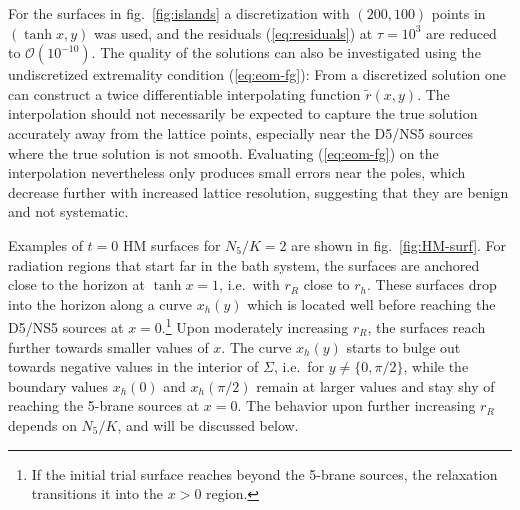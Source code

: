 \documentclass[aps,prd,11pt,notitlepage,longbibliography,nofootinbib,tightenlines,preprintnumbers]{revtex4-1}
\begin{document}
For the surfaces in fig.~\ref{fig:islands} a discretization with $(200,100)$ points in $(\tanh x,y)$ was used, and the residuals (\ref{eq:residuals}) at $\tau=10^3$ are reduced to $\mathcal O(10^{-10})$. 
The quality of the solutions can also be investigated using the undiscretized extremality condition (\ref{eq:eom-fg}):
From a discretized solution one can construct a twice differentiable interpolating function $\tilde r(x,y)$. The interpolation should not necessarily be expected to capture the true solution accurately away from the lattice points, especially near the D5/NS5 sources where the true solution is not smooth. Evaluating (\ref{eq:eom-fg}) on the interpolation nevertheless only produces small errors near the poles, which decrease further with increased lattice resolution, suggesting that they are benign and not systematic.


Examples of $t=0$  HM surfaces for $N_5/K=2$  are shown in fig.~\ref{fig:HM-surf}.
For radiation regions that start far in the bath system, the surfaces are anchored close to the horizon at $\tanh x=1$, i.e.\ with $r_R$ close to $r_h$. These surfaces drop into the horizon along a curve $x_h(y)$ which is located well before reaching the D5/NS5 sources at $x=0$.\footnote{%
If the initial trial surface reaches beyond the 5-brane sources, the relaxation transitions it into the $x>0$ region.}
Upon moderately increasing $r_R$, the surfaces reach further towards smaller values of $x$.
The curve $x_h(y)$ starts to bulge out towards negative values in the interior of $\Sigma$, i.e.\ for $y\neq \lbrace 0,\pi/2\rbrace$, 
while the boundary values $x_h(0)$ and $x_h(\pi/2)$ remain at larger values and stay shy of reaching the 5-brane sources at $x=0$.
The behavior upon further increasing $r_R$ depends on $N_5/K$, and will be discussed below.
\end{document}
